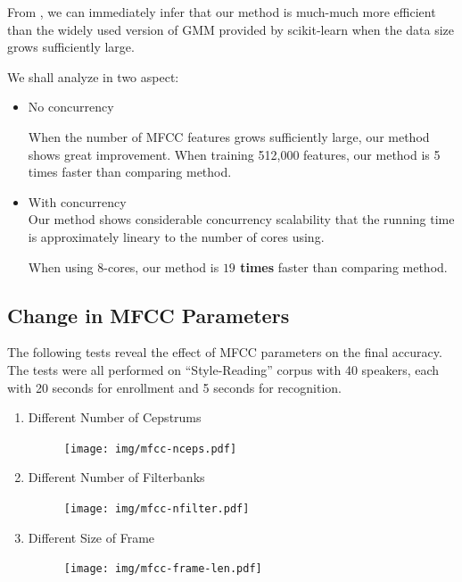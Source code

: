 From , we can immediately infer that our method
is much-much more efficient than the widely used version of GMM provided
by scikit-learn when the data size grows sufficiently large.

We shall analyze in two aspect:
\begin{itemize}
    \item No concurrency

             When the number of MFCC features grows sufficiently large, our method
                shows great improvement. When training 512,000 features, our method
                is 5 times faster than comparing method.
    \item With concurrency \\
        Our method shows considerable concurrency scalability that the running time
        is approximately lineary to the number of cores using.

        When using 8-cores, our method is \textbf{$19$ times} faster than comparing
        method.
\end{itemize}


\subsection{Change in MFCC Parameters}
The following tests reveal the effect of MFCC parameters on the final accuracy.
The tests were all performed on ``Style-Reading'' corpus with 40 speakers, each with 20 seconds for enrollment
and 5 seconds for recognition.
\begin{enumerate}
  \item Different Number of Cepstrums
    \begin{figure}[H]
      \centering
      \texttt{[image: img/mfcc-nceps.pdf]}
    \end{figure}

  \item Different Number of Filterbanks
    \begin{figure}[H]
      \centering
      \texttt{[image: img/mfcc-nfilter.pdf]}
    \end{figure}

  \item Different Size of Frame
    \begin{figure}[H]
      \centering
      \texttt{[image: img/mfcc-frame-len.pdf]}
    \end{figure}
\end{enumerate}

